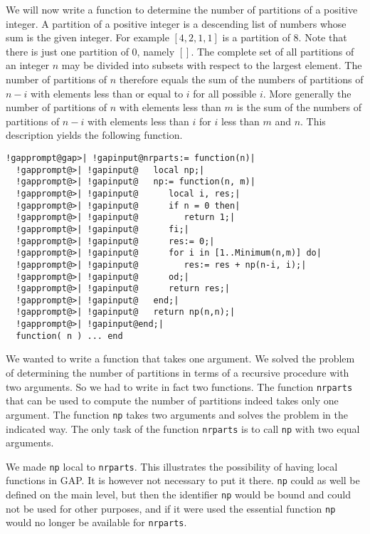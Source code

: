 \documentclass[a4paper,11pt]{report}
\begin{document}
{{ We will now write a function to determine the number of partitions of a
positive integer. A partition of a positive integer is a descending list of
numbers whose sum is the given integer. For example $[4,2,1,1]$ is a partition of 8. Note that there is just one partition of 0, namely $[ ]$. The complete set of all partitions of an integer $n$ may be divided into subsets with respect to the largest element. The number of
partitions of $n$ therefore equals the sum of the numbers of partitions of $n-i$ with elements less than or equal to $i$ for all possible $i$. More generally the number of partitions of $n$ with elements less than $m$ is the sum of the numbers of partitions of $n-i$ with elements less than $i$ for $i$ less than $m$ and $n$. This description yields the following function. 

 
\begin{Verbatim}[commandchars=!@|,fontsize=\small,frame=single,label=Example]
  !gapprompt@gap>| !gapinput@nrparts:= function(n)|
  !gapprompt@>| !gapinput@   local np;|
  !gapprompt@>| !gapinput@   np:= function(n, m)|
  !gapprompt@>| !gapinput@      local i, res;|
  !gapprompt@>| !gapinput@      if n = 0 then|
  !gapprompt@>| !gapinput@         return 1;|
  !gapprompt@>| !gapinput@      fi;|
  !gapprompt@>| !gapinput@      res:= 0;|
  !gapprompt@>| !gapinput@      for i in [1..Minimum(n,m)] do|
  !gapprompt@>| !gapinput@         res:= res + np(n-i, i);|
  !gapprompt@>| !gapinput@      od;|
  !gapprompt@>| !gapinput@      return res;|
  !gapprompt@>| !gapinput@   end;|
  !gapprompt@>| !gapinput@   return np(n,n);|
  !gapprompt@>| !gapinput@end;|
  function( n ) ... end
\end{Verbatim}
 

 We wanted to write a function that takes one argument. We solved the problem
of determining the number of partitions in terms of a recursive procedure with
two arguments. So we had to write in fact two functions. The function \texttt{nrparts} that can be used to compute the number of partitions indeed takes only one
argument. The function \texttt{np} takes two arguments and solves the problem in the indicated way. The only task
of the function \texttt{nrparts} is to call \texttt{np} with two equal arguments. 

 We made \texttt{np} local to \texttt{nrparts}. This illustrates the possibility of having local functions in \textsf{GAP}. It is however not necessary to put it there. \texttt{np} could as well be defined on the main level, but then the identifier \texttt{np} would be bound and could not be used for other purposes, and if it were used
the essential function \texttt{np} would no longer be available for \texttt{nrparts}. 

}}
\end{document}
